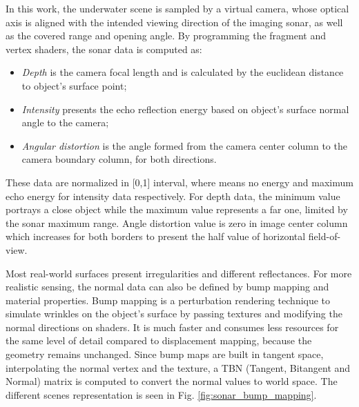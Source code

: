 \documentclass[final,5p,times]{elsarticle}
\begin{document}
In this work, the underwater scene is sampled by a virtual camera, whose optical axis is aligned with the intended viewing direction of the imaging sonar, as well as the covered range and opening angle. By programming the fragment and vertex shaders, the sonar data is computed as:

\begin{itemize}[(a)]
    \item \textit{Depth} is the camera focal length and is calculated by the euclidean distance to object's surface point;
    \item \textit{Intensity} presents the echo reflection energy based on object's surface normal angle to the camera;
    \item \textit{Angular distortion} is the angle formed from the camera center column to the camera boundary column, for both directions.
\end{itemize}

These data are normalized in [0,1] interval, where means no energy and maximum echo energy for intensity data respectively. For depth data, the minimum value portrays a close object while the maximum value represents a far one, limited by the sonar maximum range. Angle distortion value is zero in image center column which increases for both borders to present the half value of horizontal field-of-view.

Most real-world surfaces present irregularities and different reflectances. For more realistic sensing, the normal data can also be defined by bump mapping and material properties. Bump mapping is a perturbation rendering technique to simulate wrinkles on the object's surface by passing textures and modifying the normal directions on shaders. It is much faster and consumes less resources for the same level of detail compared to displacement mapping, because the geometry remains unchanged. Since bump maps are built in tangent space, interpolating the normal vertex and the texture, a TBN (Tangent, Bitangent and Normal) matrix is computed to convert the normal values to world space. The different scenes representation is seen in Fig. \ref{fig:sonar_bump_mapping}.
\end{document}
